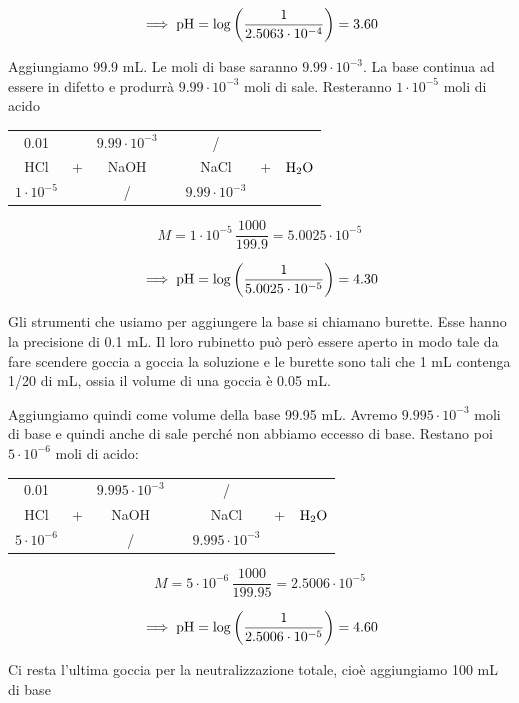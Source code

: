 $$\implies \rm pH=\log \left( \frac{1}{2.5063 \cdot 10^{-4}} \right)=3.60$$

Aggiungiamo 99.9 mL. Le moli di base saranno $9.99 \cdot 10^{-3}$. La base continua ad essere in difetto e produrrà $9.99 \cdot 10^{-3}$ moli di sale. Resteranno $1 \cdot 10^{-5}$ moli di acido

\begin{center}
    \begin{tabular}{ccccccc}
        0.01 &  & $9.99 \cdot 10^{-3}$  & & / & &\\
        HCl & + & NaOH & \ce{->} & NaCl & + & $\rm H_2O$\\
        $1 \cdot 10^{-5}$ &  &  / & & $9.99 \cdot 10^{-3}$ & &\\
    \end{tabular}
\end{center}

$$M=1 \cdot 10^{-5} \, \frac{1000}{199.9}=5.0025 \cdot 10^{-5}$$

$$\implies \rm pH=\log \left( \frac{1}{5.0025 \cdot 10^{-5}} \right)=4.30$$

Gli strumenti che usiamo per aggiungere la base si chiamano burette. Esse hanno la precisione di 0.1 mL. Il loro rubinetto può però essere aperto in modo tale da fare scendere goccia a goccia la soluzione e le burette sono tali che 1 mL contenga 1/20 di mL, ossia il volume di una goccia è 0.05 mL.

Aggiungiamo quindi come volume della base 99.95 mL. Avremo $9.995 \cdot 10^{-3}$ moli di base e quindi anche di sale perché non abbiamo eccesso di base. Restano poi $5 \cdot 10^{-6}$ moli di acido:

\begin{center}
    \begin{tabular}{ccccccc}
        0.01 &  & $9.995 \cdot 10^{-3}$  & & / & &\\
        HCl & + & NaOH & \ce{->} & NaCl & + & $\rm H_2O$\\
        $5 \cdot 10^{-6}$ &  &  / & & $9.995 \cdot 10^{-3}$ & &\\
    \end{tabular}
\end{center}

$$M=5 \cdot 10^{-6} \, \frac{1000}{199.95}=2.5006 \cdot 10^{-5}$$

$$\implies \rm pH=\log \left( \frac{1}{2.5006 \cdot 10^{-5}} \right)=4.60$$

Ci resta l'ultima goccia per la neutralizzazione totale, cioè aggiungiamo 100 mL di base

